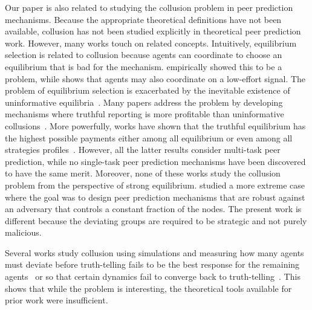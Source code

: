 Our paper is also related to studying the collusion problem in peer prediction mechanisms.  Because the appropriate theoretical definitions have not been available, collusion has not been studied explicitly in theoretical peer prediction work. However, many works touch on related concepts.  Intuitively, equilibrium selection is related to collusion because agents can coordinate to choose an equilibrium that is bad for the mechanism.  \citet{Gao2014trick} empirically showed this to be a problem, while \citet{Gao2019incentivizing} shows that agents may also coordinate on a low-effort signal.   The problem of equilibrium selection is exacerbated by the inevitable existence of uninformative equilibria~\citep{Jurca07:Collusion,Jurca2009mechanism,Waggoner2014output}.  Many papers address the problem by developing mechanisms where truthful reporting is more profitable than uninformative collusions~\citep{Jurca07:Collusion,Jurca2009mechanism,Dasgupta2013crowd, witkowski2013learning,kong18selection,radanovic2015incentive,prelec2004bayesian}.  More powerfully, works have shown that the truthful equilibrium has the highest possible payments either among all equilibrium \citep{Kong16put} or even among all strategies profiles~\citep{shnayder2016informed,KongS19,ZhangS2023multitask}. However, all the latter results consider multi-task peer prediction, while no single-task peer prediction mechanisms have been discovered to have the same merit. Moreover, none of these works study the collusion problem from the perspective of strong equilibrium. \citet{SchoenebeckYZ2021WWW} studied a more extreme case where the goal was to design peer prediction mechanisms that are robust against an adversary that controls a constant fraction of the nodes.  The present work is different because the deviating groups are required to be strategic and not purely malicious. 

Several works study collusion using simulations and measuring how many agents must deviate before truth-telling fails to be the best response for the remaining agents~\citep{Shnayder2016practcal,BurrellS2021measurement} or so that certain dynamics fail to converge back to truth-telling~\citep{Shnayder2016measuring}.  This shows that while the problem is interesting, the theoretical tools available for prior work were insufficient.   

